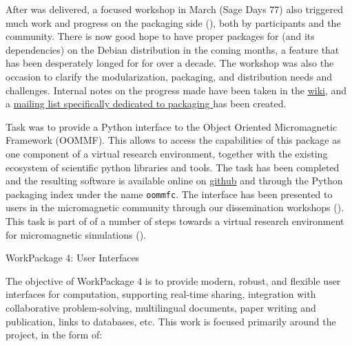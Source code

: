 \documentclass{deliverablereport}
\makeatletter
\renewcommand\subsubsection{\@startsection{subsubsection}{2}%
  \z@{.5\linespacing\@plus.7\linespacing}{.1\linespacing}%
  {\normalfont\bfseries}}
\makeatother
\begin{document}
  After  was delivered, a focused
  workshop in March (Sage Days 77) also triggered much work and progress on the packaging
  side (), both by \ODK participants and
  the community. There is now good hope to have proper packages for \Sage (and its
  dependencies) on the Debian distribution in the coming months, a feature that has been
  desperately longed for for over a decade.  The workshop was also the occasion to clarify
  the modularization, packaging, and distribution needs and challenges. Internal notes on
  the progress made have been taken in the
  \href{https://wiki.sagemath.org/days77/packaging}{\Sage wiki}, and a
  \href{https://groups.google.com/forum/#!forum/sage-packaging}{mailing list specifically
    dedicated to packaging \Sage} has been created.

  Task  was to
  provide a Python interface to the Object Oriented Micromagnetic Framework
  (OOMMF). This allows to access the capabilities of this package as one
  component of a virtual research environment, together with the existing
  ecosystem of scientific python libraries and tools. The task has been
  completed and the resulting software is available online on
  \href{https://github.com/joommf/oommfc}{github} and through the Python
  packaging index under the name \texttt{oommfc}. The interface has been presented to users in the
  micromagnetic community through our dissemination workshops 
  (). This task is part of of a
  number of steps towards a virtual research environment for micromagnetic
  simulations ().

\clearpage
\subsubsection{WorkPackage 4: User Interfaces}

The objective of WorkPackage 4 is to provide modern, robust, and flexible user interfaces for
computation, supporting real-time sharing, integration with collaborative problem-solving,
multilingual documents, paper writing and publication, links to databases, etc. This work is focused primarily around the \Jupyter project, in the form of:
\end{document}
